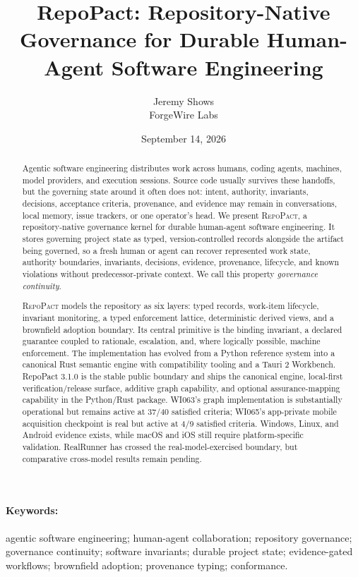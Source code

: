 \documentclass[11pt]{article}
\title{RepoPact: Repository-Native Governance for Durable Human-Agent Software Engineering}
\author{Jeremy Shows\\ForgeWire Labs}
\date{September 14, 2026}
\newcommand{\repo}{\textsc{RepoPact}\xspace}
\begin{document}
\maketitle

\begin{abstract}
Agentic software engineering distributes work across humans, coding agents, machines,
model providers, and execution sessions. Source code usually survives these handoffs, but
the governing state around it often does not: intent, authority, invariants, decisions,
acceptance criteria, provenance, and evidence may remain in conversations, local memory,
issue trackers, or one operator's head. We present \repo, a repository-native governance
kernel for durable human-agent software engineering. It stores governing project state as
typed, version-controlled records alongside the artifact being governed, so a fresh human
or agent can recover represented work state, authority boundaries, invariants, decisions,
evidence, provenance, lifecycle, and known violations without predecessor-private context.
We call this property \emph{governance continuity}.

\repo models the repository as six layers: typed records, work-item lifecycle, invariant
monitoring, a typed enforcement lattice, deterministic derived views, and a brownfield
adoption boundary. Its central primitive is the binding invariant, a declared guarantee
coupled to rationale, escalation, and, where logically possible, machine enforcement.
The implementation has evolved from a Python reference system into a canonical Rust
semantic engine with compatibility tooling and a Tauri 2 Workbench. RepoPact 3.1.0 is the
stable public boundary and ships the canonical engine, local-first verification/release
surface, additive graph capability, and optional assurance-mapping capability in the
Python/Rust package. WI063's graph implementation is substantially operational but remains
active at 37/40 satisfied criteria; WI065's app-private mobile acquisition checkpoint is
real but active at 4/9 satisfied criteria. Windows, Linux, and Android evidence exists,
while macOS and iOS still require platform-specific validation. RealRunner has crossed the
real-model-exercised boundary, but comparative cross-model results remain pending.
\end{abstract}

\paragraph{Keywords:} agentic software engineering; human-agent collaboration; repository
governance; governance continuity; software invariants; durable project state;
evidence-gated workflows; brownfield adoption; provenance typing; conformance.
\end{document}
